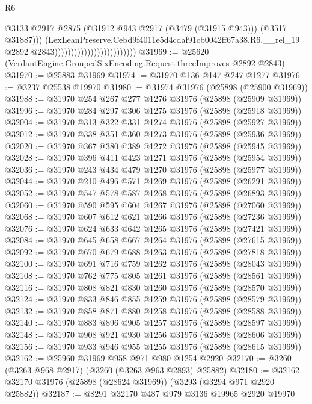 \begin{lexlean}{R6}
\begin{coremodule}
                                                        @3133
                                                        @2917
                                                        @2875
                                                        (@31912 @943 @2917 (@3479 (@31915 @943)))
                                                        (@3517 @31887)))
                                                    (LexLeanPreserve.Cebd9f4011e5d4cdaf91cb0042ff67a38.R6.__rel_19
                                                      @2892
                                                      @2843)))))))))))))))))))))))))
@31969 := @25620 (VerdantEngine.GroupedSixEncoding.Request.threeImproves @2892 @2843)
@31970 := @25883 @31969
@31974 := @31970 @136 @147 @247 @1277
@31976 := @3237 @25538 @19970
@31980 := @31974 @31976 (@25898 (@25900 @31969))
@31988 := @31970 @254 @267 @277 @1276 @31976 (@25898 (@25909 @31969))
@31996 := @31970 @284 @297 @306 @1275 @31976 (@25898 (@25918 @31969))
@32004 := @31970 @313 @322 @331 @1274 @31976 (@25898 (@25927 @31969))
@32012 := @31970 @338 @351 @360 @1273 @31976 (@25898 (@25936 @31969))
@32020 := @31970 @367 @380 @389 @1272 @31976 (@25898 (@25945 @31969))
@32028 := @31970 @396 @411 @423 @1271 @31976 (@25898 (@25954 @31969))
@32036 := @31970 @243 @434 @479 @1270 @31976 (@25898 (@25977 @31969))
@32044 := @31970 @210 @496 @571 @1269 @31976 (@25898 (@26291 @31969))
@32052 := @31970 @547 @578 @587 @1268 @31976 (@25898 (@26893 @31969))
@32060 := @31970 @590 @595 @604 @1267 @31976 (@25898 (@27060 @31969))
@32068 := @31970 @607 @612 @621 @1266 @31976 (@25898 (@27236 @31969))
@32076 := @31970 @624 @633 @642 @1265 @31976 (@25898 (@27421 @31969))
@32084 := @31970 @645 @658 @667 @1264 @31976 (@25898 (@27615 @31969))
@32092 := @31970 @670 @679 @688 @1263 @31976 (@25898 (@27818 @31969))
@32100 := @31970 @691 @716 @759 @1262 @31976 (@25898 (@28043 @31969))
@32108 := @31970 @762 @775 @805 @1261 @31976 (@25898 (@28561 @31969))
@32116 := @31970 @808 @821 @830 @1260 @31976 (@25898 (@28570 @31969))
@32124 := @31970 @833 @846 @855 @1259 @31976 (@25898 (@28579 @31969))
@32132 := @31970 @858 @871 @880 @1258 @31976 (@25898 (@28588 @31969))
@32140 := @31970 @883 @896 @905 @1257 @31976 (@25898 (@28597 @31969))
@32148 := @31970 @908 @921 @930 @1256 @31976 (@25898 (@28606 @31969))
@32156 := @31970 @933 @946 @955 @1255 @31976 (@25898 (@28615 @31969))
@32162 := @25960 @31969 @958 @971 @980 @1254 @2920
@32170 := @3260 (@3263 @968 @2917) (@3260 (@3263 @963 @2893) @25882)
@32180 := @32162 @32170 @31976 (@25898 (@28624 @31969)) (@3293 (@3294 @971 @2920 @25882))
@32187 := @8291 @32170 @487 @979 @3136 @19965 @2920 @19970

\end{coremodule}
\end{lexlean}
